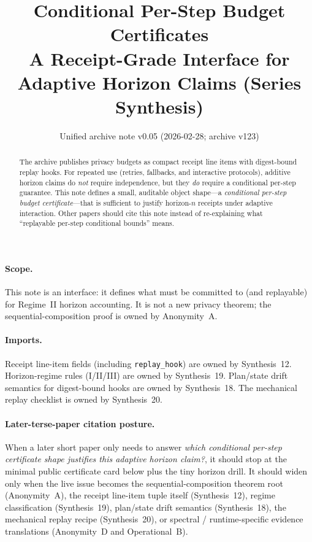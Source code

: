 \documentclass[11pt]{article}
\title{Conditional Per-Step Budget Certificates\\
\large A Receipt-Grade Interface for Adaptive Horizon Claims (Series Synthesis)}
\author{}
\date{Unified archive note v0.05 (2026-02-28; archive v123)}
\begin{document}
\maketitle

\begin{abstract}
The archive publishes privacy budgets as compact receipt line items with digest-bound replay hooks.
For repeated use (retries, fallbacks, and interactive protocols), additive horizon claims do \emph{not} require independence,
but they \emph{do} require a conditional per-step guarantee.
This note defines a small, auditable object shape---a \emph{conditional per-step budget certificate}---that is sufficient to justify
horizon-$n$ receipts under adaptive interaction.
Other papers should cite this note instead of re-explaining what ``replayable per-step conditional bounds'' means.
\end{abstract}

\paragraph{Scope.}
This note is an interface: it defines what must be committed to (and replayable) for Regime~II horizon accounting.
It is not a new privacy theorem; the sequential-composition proof is owned by Anonymity~A.\cite{series:oddsinflation}

\paragraph{Imports.}
Receipt line-item fields (including \texttt{replay\_hook}) are owned by Synthesis~12.\cite{series:receiptitems}
Horizon-regime rules (I/II/III) are owned by Synthesis~19.\cite{series:accountingrulebook}
Plan/state drift semantics for digest-bound hooks are owned by Synthesis~18.\cite{series:planstateequiv}
The mechanical replay checklist is owned by Synthesis~20.\cite{series:auditorreplay}

\paragraph{Later-terse-paper citation posture.}
When a later short paper only needs to answer \emph{which conditional per-step certificate shape justifies this adaptive horizon claim?}, it should stop at the minimal public certificate card below plus the tiny horizon drill.
It should widen only when the live issue becomes the sequential-composition theorem root (Anonymity~A), the receipt line-item tuple itself (Synthesis~12), regime classification (Synthesis~19), plan/state drift semantics (Synthesis~18), the mechanical replay recipe (Synthesis~20), or spectral / runtime-specific evidence translations (Anonymity~D and Operational~B).\cite{series:oddsinflation,series:receiptitems,series:accountingrulebook,series:planstateequiv,series:auditorreplay,series:spectral2budget,series:operationalB}
\end{document}
